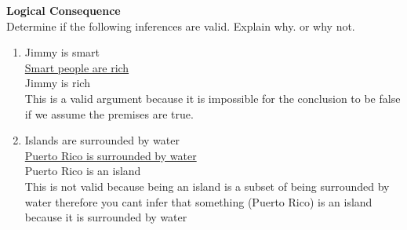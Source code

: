 \documentclass[12pt]{article}
\begin{document}
\textbf{Logical Consequence}\\

\indent Determine if the following inferences are valid. Explain why. or why not.\\

\begin{enumerate}



\item

Jimmy is smart\\
\underline{Smart people are rich}\\
Jimmy is rich\\

This is a valid argument because it is impossible for the conclusion to be false if we assume the premises are true.
\item

Islands are surrounded by water\\
\underline{Puerto Rico is surrounded by water}\\
Puerto Rico is an island\\

This is not valid because being an island is a subset of being surrounded by water therefore you cant infer that something (Puerto Rico) is an island because it is surrounded by water
\end{enumerate}
\end{document}
